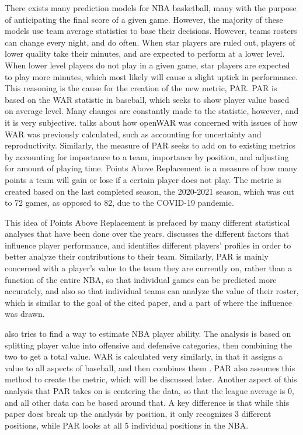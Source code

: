 \documentclass[titlepage, 12pt]{article}
\begin{document}
There exists many prediction models for NBA basketball, many with the 
purpose of anticipating the final 
score of a given game. However, the majority of these models use team 
average statistics to base their 
decisions. However, 
teams rosters can change every night, and do often. When star players 
are ruled out, players of lower 
quality take their minutes, and are expected to perform at a lower level. 
When lower level players do not 
play in a given game, star players are expected to play more minutes, 
which most likely will cause a slight 
uptick in performance. This reasoning is the cause for the creation of the 
new metric, PAR. PAR is based on the WAR statistic in baseball, which 
seeks to show player value based on average level. Many changes are 
constantly made to the statistic, however, and it is very subjective. 
\citet{Baumer} talks about how openWAR was concerned with issues of 
how WAR was previously calculated, such as accounting for uncertainty 
and reproductivity. Similarly, the measure of PAR seeks to add on to 
existing metrics by accounting for importance to a team, importance by 
position, and adjusting for amount of playing time. Points Above 
Replacement is a measure of how many points a team will gain or lose if 
a certain player does not play. 
The metric is created based on the last completed season, the 2020-2021 
season, which was cut to 72 games, as opposed to 82, due to 
the COVID-19 pandemic.

This idea of Points Above Replacement is prefaced by many different 
statistical analyses that have been done over the years. \citet{Dehesa} 
discusses the different factors that influence player performance, and 
identifies different players' profiles in order to better analyze their 
contributions to their team. Similarly, PAR is mainly concerned with a 
player's value to the team they are currently on, rather than a function of 
the entire NBA, so that individual games can be predicted more 
accurately, and also so that individual teams can analyze the value of 
their roster, which is similar to the goal of the cited paper, and a part of 
where the influence was drawn.

\citet{Fearnhead} also tries to find a way to estimate NBA player ability. 
The analysis is based on splitting player value into offensive and 
defensive categories, then combining the two to get a total value. WAR is 
calculated very similarly, in that it assigns a value to all aspects of 
baseball, and then combines them \citep{BaseballWAR}. PAR also 
assumes this method to create the metric, which will be discussed later. 
Another aspect of this analysis that PAR takes on is centering the data, so 
that the league average is 0, and all other data can be based around that. 
A key difference is that while this paper does break up the analysis by 
position, it only recognizes 3 different positions, while PAR looks at all 5 
individual positions in the NBA.
\end{document}
